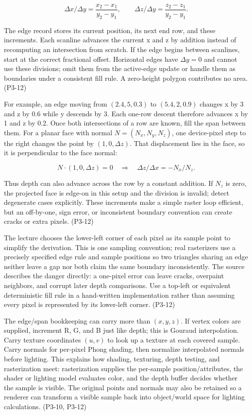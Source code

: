 \[
\Delta x/\Delta y=\frac{x_2-x_1}{y_2-y_1},\qquad
\Delta z/\Delta y=\frac{z_2-z_1}{y_2-y_1}.
\]

The edge record stores its current position, its next end row, and these increments. Each scanline advances the current x and z by addition instead of recomputing an intersection from scratch. If the edge begins between scanlines, start at the correct fractional offset. Horizontal edges have \(\Delta y=0\) and cannot use these divisions; omit them from the active-edge update or handle them as boundaries under a consistent fill rule. A zero-height polygon contributes no area. (P3-12)

For example, an edge moving from \((2.4,5,0.3)\) to \((5.4,2,0.9)\) changes x by 3 and z by 0.6 while y descends by 3. Each one-row descent therefore advances x by 1 and z by 0.2. Once both intersections of a row are known, fill the span between them. For a planar face with normal \(N=(N_x,N_y,N_z)\), one device-pixel step to the right changes the point by \((1,0,\Delta z)\). That displacement lies in the face, so it is perpendicular to the face normal:

\[
N\cdot(1,0,\Delta z)=0\quad\Rightarrow\quad\Delta z/\Delta x=-N_x/N_z.
\]

Thus depth can also advance across the row by a constant addition. If \(N_z\) is zero, the projected face is edge-on in this setup and the division is invalid; detect degenerate cases explicitly. These increments make a simple raster loop efficient, but an off-by-one, sign error, or inconsistent boundary convention can create cracks or extra pixels. (P3-12)

The lecture chooses the lower-left corner of each pixel as its sample point to simplify the derivation. This is one sampling convention; real rasterizers use a precisely specified edge rule and sample positions so two triangles sharing an edge neither leave a gap nor both claim the same boundary inconsistently. The source describes the danger directly: a one-pixel error can leave cracks, overpaint neighbors, and corrupt later depth comparisons. Use a top-left or equivalent deterministic fill rule in a hand-written implementation rather than assuming every pixel is represented by its lower-left corner. (P3-12)

The edge/span bookkeeping can carry more than \((x,y,z)\). If vertex colors are supplied, increment R, G, and B just like depth; this is Gouraud interpolation. Carry texture coordinates \((u,v)\) to look up a texture at each covered sample. Carry normals for per-pixel Phong shading, then normalize interpolated normals before lighting. This explains how shading, texturing, depth testing, and rasterization meet: rasterization supplies the per-sample position/attributes, the shader or lighting model evaluates color, and the depth buffer decides whether the sample is visible. The original points and normals may also be retained so a renderer can transform a visible sample back into object/world space for lighting calculations. (P3-10, P3-12)

